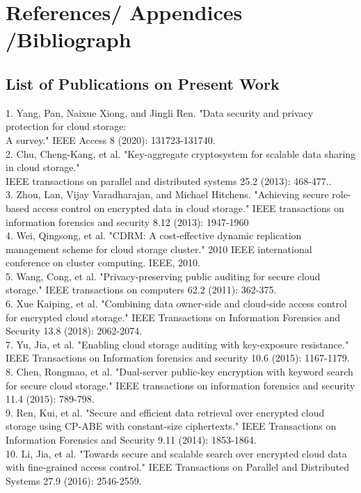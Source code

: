 \chapter{References/ Appendices /Bibliograph}
\section{List of Publications on Present Work}
1. Yang, Pan, Naixue Xiong, and Jingli Ren. "Data security and privacy protection for cloud storage:\\
A survey." IEEE Access 8 (2020): 131723-131740.\\
2. Chu, Cheng-Kang, et al. "Key-aggregate cryptosystem for scalable data sharing in cloud storage."\\
IEEE transactions on parallel and distributed systems 25.2 (2013): 468-477..\\
3. Zhou, Lan, Vijay Varadharajan, and Michael Hitchens. "Achieving secure role-based access control
on encrypted data in cloud storage." IEEE transactions on information forensics and security 8.12
(2013): 1947-1960\\
4. Wei, Qingsong, et al. "CDRM: A cost-effective dynamic replication management scheme for cloud
storage cluster." 2010 IEEE international conference on cluster computing. IEEE, 2010.\\
5. Wang, Cong, et al. "Privacy-preserving public auditing for secure cloud storage." IEEE transactions
on computers 62.2 (2011): 362-375.
\\
6. Xue Kaiping, et al. "Combining data owner-side and cloud-side access control for encrypted cloud
storage." IEEE Transactions on Information Forensics and Security 13.8 (2018): 2062-2074.\\
7. Yu, Jia, et al. "Enabling cloud storage auditing with key-exposure resistance." IEEE Transactions
on Information forensics and security 10.6 (2015): 1167-1179.\\
8. Chen, Rongmao, et al. "Dual-server public-key encryption with keyword search for secure cloud
storage." IEEE transactions on information forensics and security 11.4 (2015): 789-798.\\
9. Ren, Kui, et al. "Secure and efficient data retrieval over encrypted cloud storage using CP-ABE
with constant-size ciphertexts." IEEE Transactions on Information Forensics and Security 9.11
(2014): 1853-1864.\\
10. Li, Jia, et al. "Towards secure and scalable search over encrypted cloud data with fine-grained
access control." IEEE Transactions on Parallel and Distributed Systems 27.9 (2016): 2546-2559.\\
